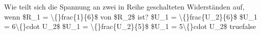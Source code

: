     {Wie teilt sich die Spannung an zwei in Reihe geschalteten Widerständen auf, wenn \$R\_1 = \textbackslash\{\}frac\{1\}\{6\}\$ von \$R\_2\$ ist? }
    {\$U\_1 = \textbackslash\{\}frac\{U\_2\}\{6\}\$}
    {\$U\_1 = 6\textbackslash\{\}cdot U\_2\$}
    {\$U\_1 = \textbackslash\{\}frac\{U\_2\}\{5\}\$}
    {\$U\_1 = 5\textbackslash\{\}cdot U\_2\$}
    {true}{false}